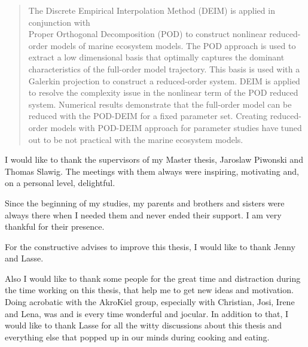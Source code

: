 \documentclass[
12pt, %
openany,
english, %
onehalfspacing, %
headsepline, %
]{MastersDoctoralThesis} %
\begin{document}


\begin{abstract}
\addchaptertocentry{\abstractname} %
The Discrete Empirical Interpolation Method (DEIM) is applied in conjunction with \\
Proper
Orthogonal Decomposition (POD) to construct nonlinear reduced-order models of marine ecosystem models. 
The POD approach is used to extract a low dimensional basis that optimally
captures the dominant characteristics of the full-order model trajectory. This basis is used with
a Galerkin projection to construct a reduced-order system. DEIM is applied to
resolve the complexity issue in the nonlinear term of the POD reduced system.
Numerical results demonstrate that the full-order model can be reduced with the POD-DEIM
for a fixed parameter set. Creating reduced-order models with POD-DEIM approach for parameter studies have
tuned out to be not practical with the marine ecosystem models. 
\end{abstract}


\begin{acknowledgements}
\addchaptertocentry{\acknowledgementname} %
I would like to thank the supervisors of my Master thesis, Jaroslaw Piwonski and Thomas Slawig. The meetings with them always were 
inspiring, motivating and, on a personal level, delightful. 

Since the beginning of my studies, my parents and brothers and sisters were always there when I needed them
and never ended their support. I am very thankful for their presence.

For the constructive advises to improve this thesis, I would like to thank Jenny and Lasse.  

Also I would like to thank some people for the great time and distraction during the time working on this thesis, 
that help me to get new ideas and motivation.
Doing acrobatic with the AkroKiel group, especially with Christian, Josi, Irene and Lena, was and is every time wonderful and jocular. 
In addition to that, I would like to thank Lasse for all the witty discussions 
about this thesis and everything else that popped up in our minds during cooking and eating.
\end{acknowledgements}
\end{document}
